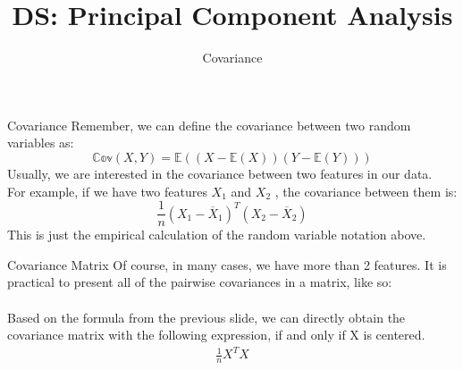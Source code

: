 \documentclass[aspectratio=169]{../latex_main/tntbeamer}  %
\title[Introduction]{DS: Principal Component Analysis}
\subtitle{Covariance}
\begin{document}
	
	\maketitle
	\begin{frame}{Covariance}
	    Remember, we can define the covariance between two random variables as:
	    \begin{equation*}
	        \mathbb{Cov}(X,Y) = \mathbb{E}((X - \mathbb{E}(X))(Y- \mathbb{E}(Y)))
	    \end{equation*}
	    Usually, we are interested in the covariance between two features in our data.\\
	    For example, if we have two features   $X_1$     and       $X_2$ , the covariance between them is:
	    \begin{equation*}
	        \frac{1}{n}(X_1 - \overline{X}_1)^T(X_2 - \overline{X}_2)
	    \end{equation*}
	    This is just the empirical calculation of the random variable notation above.

	\end{frame}
	
	\begin{frame}{Covariance Matrix}
	    Of course, in many cases, we have more than 2 features. It is practical to present all of the pairwise covariances in a matrix, like so:\\
	    \bigskip
	    \\
	    \bigskip
	    Based on the formula from the previous slide, we can directly obtain the covariance matrix with the following expression, if and only if X is centered.
	    \begin{align*}
	        \frac{1}{n}X^TX
	    \end{align*}
	\end{frame}
	
	
	
\end{document}
